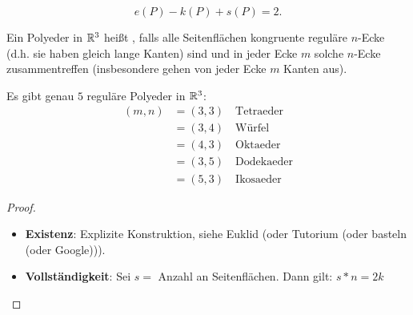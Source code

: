 \begin{deduction}
  \begin{equation*}
    e(P) - k(P) + s(P) = 2\text{.}
  \end{equation*}
\end{deduction}

\begin{definition}
  Ein Polyeder in $ \mathbb{R}^3 $ heißt \label{def:regulaererPolyeder}, falls alle Seitenflächen kongruente reguläre $ n $-Ecke (d.h. sie haben gleich lange Kanten) sind und in jeder Ecke $ m $ solche $ n $-Ecke zusammentreffen (insbesondere gehen von jeder Ecke $ m $ Kanten aus).
\end{definition}

\begin{theorem}
  Es gibt genau $ 5 $ reguläre Polyeder in $ \mathbb{R}^3 $:
  \begin{align*}
    (m,n) &= (3,3) \quad \text{Tetraeder}  \\
     &= (3,4) \quad \text{Würfel} \\
     &= (4,3) \quad \text{Oktaeder} \\
     &= (3,5) \quad \text{Dodekaeder} \\
     &= (5,3) \quad \text{Ikosaeder}
  \end{align*}
  \begin{proof}
    \
    \begin{itemize}
      \item \textbf{Existenz}: Explizite Konstruktion, siehe Euklid (oder Tutorium (oder basteln (oder Google))).
      \item \textbf{Vollständigkeit}: Sei $ s = $ Anzahl an Seitenflächen. Dann gilt: $ s*n = 2k $
    \end{itemize}
  \end{proof}
\end{theorem}